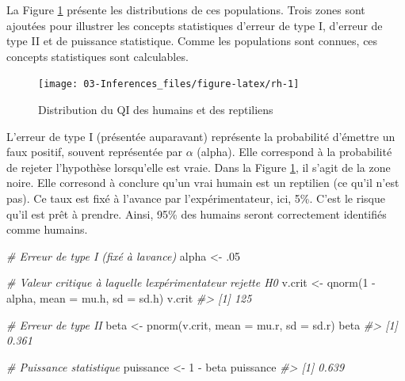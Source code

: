 \documentclass[
]{book}
\newenvironment{Shaded}{}{}
\newcommand{\AttributeTok}[1]{#1}
\newcommand{\CommentTok}[1]{\textit{#1}}
\newcommand{\DecValTok}[1]{#1}
\newcommand{\FunctionTok}[1]{#1}
\newcommand{\NormalTok}[1]{#1}
\newcommand{\OtherTok}[1]{#1}
\newcommand{\SpecialCharTok}[1]{#1}
\begin{document}
La Figure \ref{fig:rh} présente les distributions de ces populations. Trois zones sont ajoutées pour illustrer les concepts statistiques d'erreur de type I, d'erreur de type II et de puissance statistique. Comme les populations sont connues, ces concepts statistiques sont calculables.

\begin{figure}

{\centering \texttt{[image: 03-Inferences\_files/figure-latex/rh-1]} 

}

\caption{Distribution du QI des humains et des reptiliens}\label{fig:rh}
\end{figure}

L'erreur de type I (présentée auparavant) représente la probabilité d'émettre un faux positif, souvent représentée par \(\alpha\) (alpha). Elle correspond à la probabilité de rejeter l'hypothèse lorsqu'elle est vraie. Dans la Figure \ref{fig:rh}, il s'agit de la zone noire. Elle corresond à conclure qu'un vrai humain est un reptilien (ce qu'il n'est pas). Ce taux est fixé à l'avance par l'expérimentateur, ici, 5\%. C'est le risque qu'il est prêt à prendre. Ainsi, 95\% des humains seront correctement identifiés comme humains.

\begin{Shaded}
\begin{Highlighting}[]
\CommentTok{\# Erreur de type I (fixé à l\textquotesingle{}avance)}
\NormalTok{alpha }\OtherTok{\textless{}{-}}\NormalTok{ .}\DecValTok{05} 

\CommentTok{\# Valeur critique à laquelle l\textquotesingle{}expérimentateur rejette H0}
\NormalTok{v.crit }\OtherTok{\textless{}{-}} \FunctionTok{qnorm}\NormalTok{(}\DecValTok{1} \SpecialCharTok{{-}}\NormalTok{ alpha, }\AttributeTok{mean =}\NormalTok{ mu.h, }\AttributeTok{sd =}\NormalTok{ sd.h)}
\NormalTok{v.crit}
\CommentTok{\#\textgreater{} [1] 125}

\CommentTok{\# Erreur de type II}
\NormalTok{beta }\OtherTok{\textless{}{-}} \FunctionTok{pnorm}\NormalTok{(v.crit, }\AttributeTok{mean =}\NormalTok{ mu.r, }\AttributeTok{sd =}\NormalTok{ sd.r)}
\NormalTok{beta}
\CommentTok{\#\textgreater{} [1] 0.361}

\CommentTok{\# Puissance statistique}
\NormalTok{puissance }\OtherTok{\textless{}{-}} \DecValTok{1} \SpecialCharTok{{-}}\NormalTok{ beta}
\NormalTok{puissance }
\CommentTok{\#\textgreater{} [1] 0.639}
\end{Highlighting}
\end{Shaded}
\end{document}
